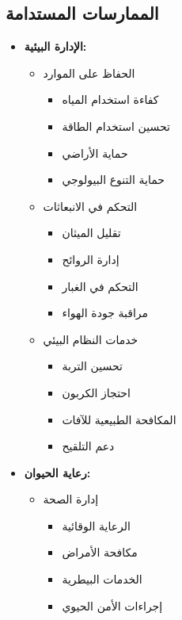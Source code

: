 \subsection{الممارسات المستدامة}
\begin{itemize}
    \item \textbf{الإدارة البيئية:}
    \begin{itemize}
        \item الحفاظ على الموارد
        \begin{itemize}
            \item كفاءة استخدام المياه
            \item تحسين استخدام الطاقة
            \item حماية الأراضي
            \item حماية التنوع البيولوجي
        \end{itemize}
        
        \item التحكم في الانبعاثات
        \begin{itemize}
            \item تقليل الميثان
            \item إدارة الروائح
            \item التحكم في الغبار
            \item مراقبة جودة الهواء
        \end{itemize}
        
        \item خدمات النظام البيئي
        \begin{itemize}
            \item تحسين التربة
            \item احتجاز الكربون
            \item المكافحة الطبيعية للآفات
            \item دعم التلقيح
        \end{itemize}
    \end{itemize}
    
    \item \textbf{رعاية الحيوان:}
    \begin{itemize}
        \item إدارة الصحة
        \begin{itemize}
            \item الرعاية الوقائية
            \item مكافحة الأمراض
            \item الخدمات البيطرية
            \item إجراءات الأمن الحيوي
        \end{itemize}
        

\end{itemize}
\end{itemize}
